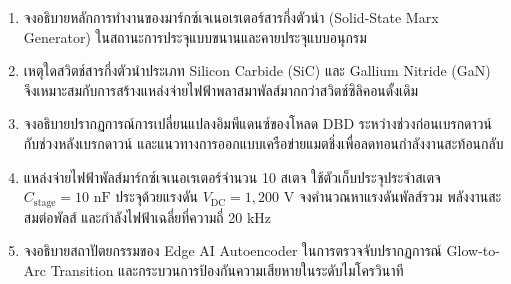 \begin{enumerate}
    \item จงอธิบายหลักการทำงานของมาร์กซ์เจเนอเรเตอร์สารกึ่งตัวนำ (Solid-State Marx Generator) ในสถานะการประจุแบบขนานและคายประจุแบบอนุกรม
    \item เหตุใดสวิตช์สารกึ่งตัวนำประเภท Silicon Carbide (SiC) และ Gallium Nitride (GaN) จึงเหมาะสมกับการสร้างแหล่งจ่ายไฟฟ้าพลาสมาพัลส์มากกว่าสวิตช์ซิลิคอนดั้งเดิม
    \item จงอธิบายปรากฏการณ์การเปลี่ยนแปลงอิมพีแดนซ์ของโหลด DBD ระหว่างช่วงก่อนเบรกดาวน์กับช่วงหลังเบรกดาวน์ และแนวทางการออกแบบเครือข่ายแมตชิ่งเพื่อลดทอนกำลังงานสะท้อนกลับ
    \item แหล่งจ่ายไฟฟ้าพัลส์มาร์กซ์เจเนอเรเตอร์จำนวน 10 สเตจ ใช้ตัวเก็บประจุประจำสเตจ $C_{\text{stage}} = 10 \text{ nF}$ ประจุด้วยแรงดัน $V_{\text{DC}} = 1,200 \text{ V}$ จงคำนวณหาแรงดันพัลส์รวม พลังงานสะสมต่อพัลส์ และกำลังไฟฟ้าเฉลี่ยที่ความถี่ 20 kHz
    \item จงอธิบายสถาปัตยกรรมของ Edge AI Autoencoder ในการตรวจจับปรากฏการณ์ Glow-to-Arc Transition และกระบวนการป้องกันความเสียหายในระดับไมโครวินาที
\end{enumerate}
